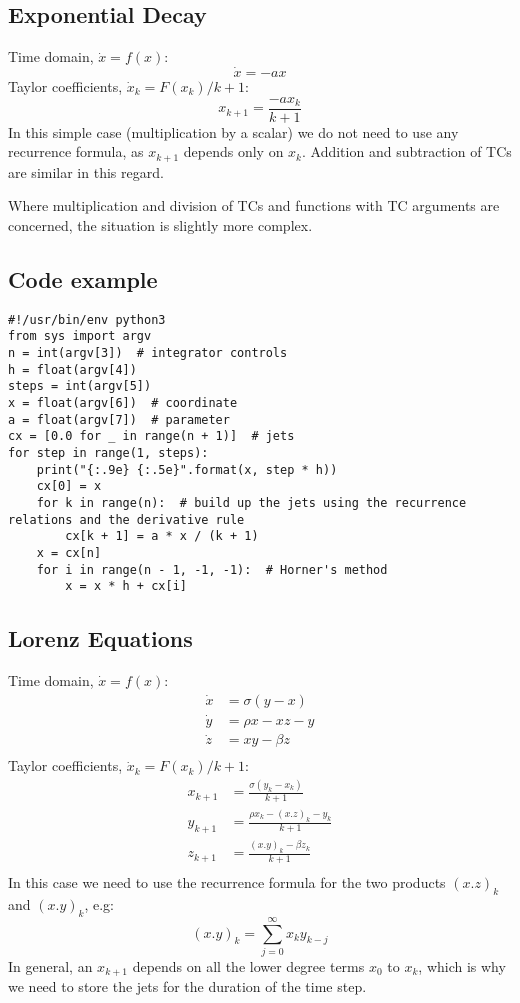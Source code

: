 \documentclass[11pt]{article}
\begin{document}
\subsection{Exponential Decay}
Time domain, $\dot{x} = f(x)$:
\begin{equation}
\dot{x} = - a x
\end{equation}
Taylor coefficients, $\dot{x}_k = F(x_k) / k + 1$:
\begin{equation}
x_{k+1} = \frac{- a x_k} {k + 1}
\end{equation}
In this simple case (multiplication by a scalar) we do not need to use any recurrence formula, as $x_{k+1}$ depends only on $x_k$.
Addition and subtraction of TCs are similar in this regard.

Where multiplication and division of TCs and functions with TC arguments are concerned, the situation is slightly more complex.
\subsection{Code example}
\begin{verbatim}
#!/usr/bin/env python3
from sys import argv
n = int(argv[3])  # integrator controls
h = float(argv[4])
steps = int(argv[5])
x = float(argv[6])  # coordinate
a = float(argv[7])  # parameter
cx = [0.0 for _ in range(n + 1)]  # jets
for step in range(1, steps):
    print("{:.9e} {:.5e}".format(x, step * h))
    cx[0] = x
    for k in range(n):  # build up the jets using the recurrence relations and the derivative rule
        cx[k + 1] = a * x / (k + 1)
    x = cx[n]
    for i in range(n - 1, -1, -1):  # Horner's method
        x = x * h + cx[i]
\end{verbatim}

\subsection{Lorenz Equations}
Time domain, $\dot{x} = f(x)$:
\begin{equation}
\begin{aligned}
\dot{x} &= \sigma (y - x) \\
\dot{y} &= \rho x - xz - y \\
\dot{z} &= xy - \beta z \\
\end{aligned}
\end{equation}
Taylor coefficients, $\dot{x}_k = F(x_k) / k + 1$:
\begin{equation}
\begin{aligned}
x_{k+1} &= \frac{\sigma (y_k - x_k)}{k + 1} \\
y_{k+1} &= \frac{\rho x_k - (x.z)_k - y_k}{k + 1} \\
z_{k+1} &= \frac{(x.y)_k - \beta z_k}{k + 1} \\
\end{aligned}
\end{equation}
In this case we need to use the recurrence formula for the two products $(x.z)_k$ and $(x.y)_k$, e.g:
\begin{equation}
(x.y)_k = \sum_{j=0}^{\infty} x_k y_{k - j}
\end{equation}
In general, an $x_{k+1}$ depends on all the lower degree terms $x_0$ to $x_k$, which is why we need to store the jets for the duration of the time step.
\end{document}
